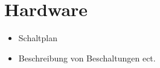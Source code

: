 \section{Hardware}
\label{sec:Hardware}

\begin{itemize}
    \item Schaltplan
    \item Beschreibung von Beschaltungen ect.
\end{itemize}